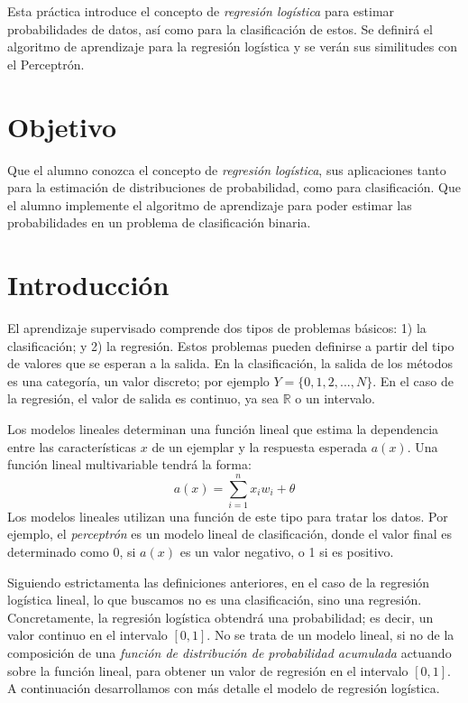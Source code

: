 
Esta práctica introduce el concepto de \emph{regresión logística} para estimar probabilidades de datos, así como para la clasificación de estos. Se definirá el algoritmo de aprendizaje para la regresión logística y se verán sus similitudes con el Perceptrón.


\section{Objetivo}

Que el alumno conozca el concepto de \textit{regresión logística}, sus aplicaciones tanto para la estimación de distribuciones de probabilidad, como para clasificación. Que el alumno implemente el algoritmo de aprendizaje para poder estimar las probabilidades en un problema de clasificación binaria.

\section{Introducción}

El aprendizaje supervisado comprende dos tipos de problemas básicos: 1) la clasificación; y 2) la regresión. Estos problemas pueden definirse a partir del tipo de valores que se esperan a la salida. En la clasificación, la salida de los métodos es una categoría, un valor discreto; por ejemplo $Y = \{0,1,2,...,N\}$. En el caso de la regresión, el valor de salida es continuo, ya sea $\mathbb{R}$ o un intervalo.

Los modelos lineales determinan una función lineal que estima la dependencia entre las características $x$ de un ejemplar y la respuesta esperada $a(x)$. Una función lineal multivariable tendrá la forma: $$a(x) = \sum_{i=1}^n x_iw_i + \theta$$
Los modelos lineales utilizan una función de este tipo para tratar los datos. Por ejemplo, el \textit{perceptrón} es un modelo lineal de clasificación, donde el valor final es determinado como 0, si $a(x)$ es un valor negativo, o 1 si es positivo.

Siguiendo estrictamenta las definiciones anteriores, en el caso de la regresión logística lineal, lo que buscamos no es una clasificación, sino una regresión. Concretamente, la regresión logística obtendrá una probabilidad; es decir, un valor continuo en el intervalo $[0,1]$. No se trata de un modelo lineal, si no de la composición de una \emph{función de distribución de probabilidad acumulada} actuando sobre la función lineal, para obtener un valor de regresión en el intervalo $[0,1]$. A continuación desarrollamos con más detalle el modelo de regresión logística.


